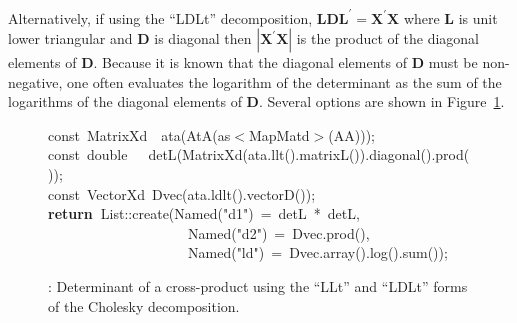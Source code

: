 \documentclass[shortnames,article]{jss}
\newcommand{\hlstd}[1]{\textcolor[rgb]{0,0,0}{#1}}
\newcommand{\hlopt}[1]{\textcolor[rgb]{0,0,0}{#1}}
\newcommand{\hlstr}[1]{\textcolor[rgb]{0.90,0.15,0.15}{#1}}
\newcommand{\hlkwa}[1]{\textcolor[rgb]{0.61,0.13,0.93}{\bf{#1}}}
\newcommand{\hlkwb}[1]{\textcolor[rgb]{0.13,0.54,0.13}{#1}}
\newcommand{\hlkwd}[1]{\textcolor[rgb]{0,0,0}{#1}}
\begin{document}
Alternatively, if using the ``LDLt'' decomposition, $\bm L\bm D\bm
L^\prime=\bm X^\prime\bm X$ where $\bm L$ is unit lower triangular and
$\bm D$ is diagonal then $|\bm X^\prime\bm X|$ is the product of the
diagonal elements of $\bm D$.  Because it is known that the diagonal
elements of $\bm D$ must be non-negative, one often evaluates the
logarithm of the determinant as the sum of the logarithms of the
diagonal elements of $\bm D$.  Several options are shown in
Figure~\ref{cholDet}.

\begin{figure}[htb]
    \noindent
    \ttfamily
    \hlstd{}\hlkwb{const\ }\hlstd{MatrixXd}\hlstd{\ \ }\hlstd{}\hlkwd{ata}\hlstd{}\hlopt{(}\hlstd{}\hlkwd{AtA}\hlstd{}\hlopt{(}\hlstd{as}\hlopt{$<$}\hlstd{MapMatd}\hlopt{$>$(}\hlstd{AA}\hlopt{)));}\hspace*{\fill}\\
    \hlstd{}\hlkwb{const\ double}\hlstd{\ \ \ }\hlkwb{}\hlstd{}\hlkwd{detL}\hlstd{}\hlopt{(}\hlstd{}\hlkwd{MatrixXd}\hlstd{}\hlopt{(}\hlstd{ata}\hlopt{.}\hlstd{}\hlkwd{llt}\hlstd{}\hlopt{().}\hlstd{}\hlkwd{matrixL}\hlstd{}\hlopt{()).}\hlstd{}\hlkwd{diagonal}\hlstd{}\hlopt{().}\hlstd{}\hlkwd{prod}\hlstd{}\hlopt{());}\hspace*{\fill}\\
    \hlstd{}\hlkwb{const\ }\hlstd{VectorXd\ }\hlkwd{Dvec}\hlstd{}\hlopt{(}\hlstd{ata}\hlopt{.}\hlstd{}\hlkwd{ldlt}\hlstd{}\hlopt{().}\hlstd{}\hlkwd{vectorD}\hlstd{}\hlopt{());}\hspace*{\fill}\\
    \hlstd{}\hlkwa{return\ }\hlstd{List}\hlopt{::}\hlstd{}\hlkwd{create}\hlstd{}\hlopt{(}\hlstd{Named}\hlopt{{(}}\hlstd{}\hlstr{"d1"}\hlstd{}\hlopt{{)}\ =\ }\hlstd{detL\ }\hlopt{{*}\ }\hlstd{detL}\hlopt{,}\hspace*{\fill}\\
    \hlstd{}\hlstd{\ \ \ \ \ \ \ \ \ \ \ \ \ \ \ \ \ \ \ \ }\hlstd{Named}\hlopt{{(}}\hlstd{}\hlstr{"d2"}\hlstd{}\hlopt{{)}\ =\ }\hlstd{Dvec}\hlopt{.}\hlstd{}\hlkwd{prod}\hlstd{}\hlopt{(),}\hspace*{\fill}\\
    \hlstd{}\hlstd{\ \ \ \ \ \ \ \ \ \ \ \ \ \ \ \ \ \ \ \ }\hlstd{Named}\hlopt{{(}}\hlstd{}\hlstr{"ld"}\hlstd{}\hlopt{{)}\ =\ }\hlstd{Dvec}\hlopt{.}\hlstd{}\hlkwd{array}\hlstd{}\hlopt{().}\hlstd{}\hlkwd{log}\hlstd{}\hlopt{().}\hlstd{}\hlkwd{sum}\hlstd{}\hlopt{());}\hlstd{}\hspace*{\fill}\\
    \mbox{}
    \normalfont
    \normalsize
  \caption{: Determinant of a cross-product using
    the ``LLt'' and ``LDLt'' forms of the Cholesky decomposition.}
  \label{cholDet}
\end{figure}
\end{document}
